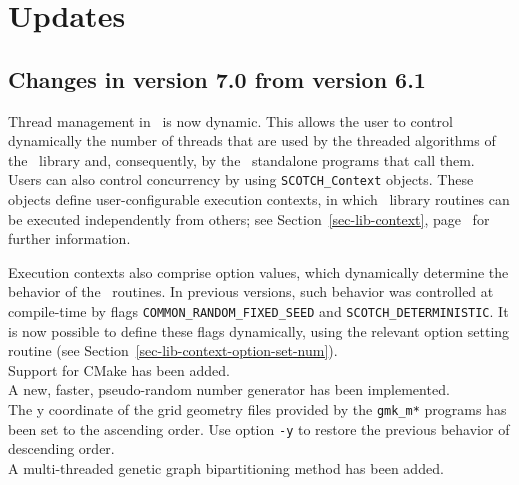 
\section{Updates}
\label{sec-changes}

\subsection{Changes in version 7.0 from version 6.1}

Thread management in \scotch\ is now dynamic. This allows the user to
control dynamically the number of threads that are used by the
threaded algorithms of the \libscotch\ library and, consequently, by
the \scotch\ standalone programs that call them. Users can also
control concurrency by using \texttt{SCOTCH\_\lbt Context}
objects. These objects define user-configurable execution contexts, in
which \libscotch\ library routines can be executed independently from
others; see Section~\ref{sec-lib-context},
page~\pageref{sec-lib-context} for further information.

Execution contexts also comprise option values, which dynamically
determine the behavior of the \scotch\ routines. In previous versions,
such behavior was controlled at compile-time by flags
\texttt{COMMON\_\lbt RANDOM\_\lbt FIXED\_\lbt SEED} and
\texttt{SCOTCH\_\lbt DETERMINISTIC}. It is now possible to define
these flags dynamically, using the relevant option setting routine
(see Section~\ref{sec-lib-context-option-set-num}).
\\

Support for CMake has been added.
\\

A new, faster, pseudo-random number generator has been implemented.
\\

The y coordinate of the grid geometry files provided by the
\texttt{gmk\_m*} programs has been set to the ascending order. Use
option \texttt{-y} to restore the previous behavior of descending
order.
\\

A multi-threaded genetic graph bipartitioning method has been added.
\\

